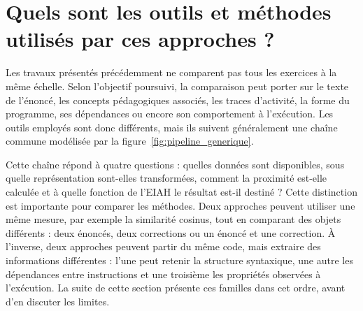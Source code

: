 \documentclass[12pt,a4paper,oneside]{report}
\begin{document}

\clearpage
\section{Quels sont les outils et méthodes utilisés par ces approches ?}



Les travaux présentés précédemment ne comparent pas tous les exercices à la
même échelle. Selon l'objectif poursuivi, la comparaison peut porter sur le
texte de l'énoncé, les concepts pédagogiques associés, les traces d'activité,
la forme du programme, ses dépendances ou encore son comportement à
l'exécution. Les outils employés sont donc différents, mais ils suivent
généralement une chaîne commune modélisée par la
figure~\ref{fig:pipeline_generique}.

Cette chaîne répond à quatre questions : quelles données sont disponibles,
sous quelle représentation sont-elles transformées, comment la proximité
est-elle calculée et à quelle fonction de l'EIAH le résultat est-il destiné ?
Cette distinction est importante pour comparer les méthodes. Deux approches
peuvent utiliser une même mesure, par exemple la similarité cosinus, tout en
comparant des objets différents : deux énoncés, deux corrections ou un énoncé
et une correction. À l'inverse, deux approches peuvent partir du même code,
mais extraire des informations différentes : l'une peut retenir la structure
syntaxique, une autre les dépendances entre instructions et une troisième les
propriétés observées à l'exécution. La suite de cette section présente ces
familles dans cet ordre, avant d'en discuter les limites.
\end{document}
